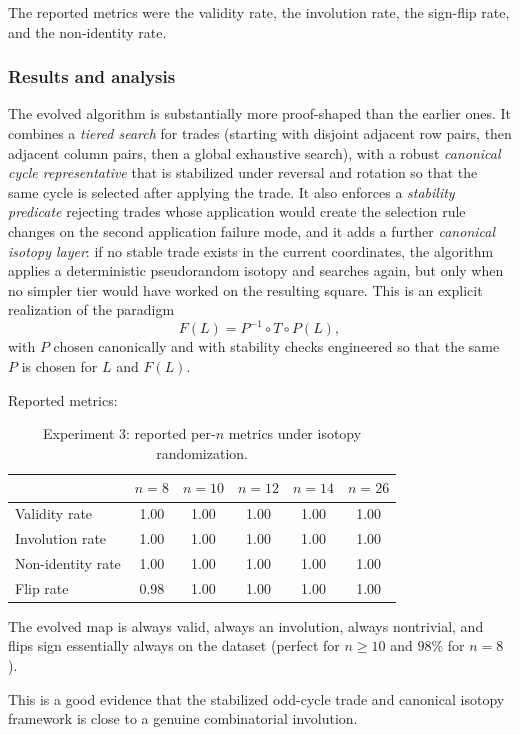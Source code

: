 \documentclass[11pt]{amsart}
\begin{document}
The reported metrics were the validity rate, the involution rate, the sign-flip rate, and the non-identity rate.

\subsubsection{Results and analysis}
The evolved algorithm is substantially more proof-shaped than the earlier ones. It combines a \emph{tiered search} for trades (starting with disjoint adjacent row pairs, then adjacent column pairs, then a global exhaustive search), with a robust \emph{canonical cycle representative} that is stabilized under reversal and rotation so that the same cycle is selected after applying the trade. It also enforces a \emph{stability predicate} rejecting trades whose application would create the selection rule changes on the second application failure mode, and it adds a further \emph{canonical isotopy layer}: if no stable trade exists in the current coordinates, the algorithm applies a deterministic pseudorandom isotopy and searches again, but only when no simpler tier would have worked on the resulting square. This is an explicit realization of the paradigm
\[
F(L)=P^{-1}\circ T\circ P(L),
\]
with $P$ chosen canonically and with stability checks engineered so that the same $P$ is chosen for $L$ and $F(L)$.

Reported metrics:

\begin{table}[h]
\centering
\begin{tabular}{@{}lccccc@{}}
\toprule
 & $n=8$ & $n=10$ & $n=12$ & $n=14$ & $n=26$ \\
\midrule
Validity rate & 1.00 & 1.00 & 1.00 & 1.00 & 1.00 \\
Involution rate & 1.00 & 1.00 & 1.00 & 1.00 & 1.00 \\
Non-identity rate & 1.00 & 1.00 & 1.00 & 1.00 & 1.00 \\
Flip rate & 0.98 & 1.00 & 1.00 & 1.00 & 1.00 \\
\bottomrule
\end{tabular}
\caption{Experiment 3: reported per-$n$ metrics under isotopy randomization.}
\end{table}

The evolved map is always valid, always an involution, always nontrivial, and flips sign essentially always on the dataset (perfect for $n\ge 10$ and $98\%$ for $n=8$).

This is a good evidence that the stabilized odd-cycle trade and canonical isotopy framework is close to a genuine combinatorial involution.
\end{document}
